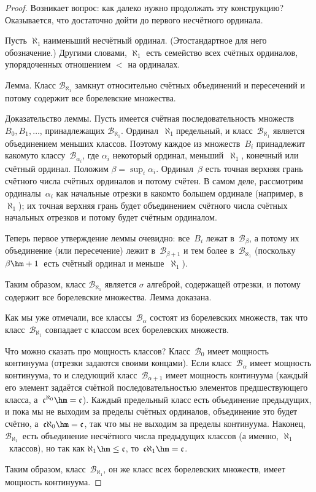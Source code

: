 \begin{proof}
Возникает вопрос: как далеко нужно продолжать эту конструкцию?
Оказывается, что достаточно дойти до первого несчётного
ординала.

Пусть $\aleph_1$\т наименьший
несчётный ординал. (Это\т стандартное
для него обозначение.) Другими словами, $\aleph_1$ есть семейство всех
счётных ординалов, упорядоченных отношением $<$ на ординалах.

\textsf{Лемма.} Класс $\mathcal{B}_{\aleph_1}$ замкнут
относительно счётных объединений
и пересечений и потому содержит все борелевские множества.

Доказательство леммы. Пусть имеется счётная последовательность
множеств $B_0, B_1, \dots$, принадлежащих $\mathcal{B}_{\aleph_1}$.
Ординал~$\aleph_1$\т предельный, и класс~$\mathcal{B}_{\aleph_1}$
является объединением
меньших классов. Поэтому каждое из множеств~$B_i$ принадлежит
какому\д то классу~$\mathcal{B}_{\alpha_i}$, где $\alpha_i$\т
некоторый ординал, меньший~$\aleph_1$,  конечный или
счётный ординал. Положим $\beta=\sup_i \alpha_i$. Ординал~$\beta$ есть
точная верхняя грань счётного числа счётных
ординалов и потому счётен. В самом деле, рассмотрим
ординалы~$\alpha_i$ как начальные отрезки в каком\д то большем ординале
(например, в~$\aleph_1$); их точная верхняя грань будет
объединением счётного числа счётных начальных отрезков и
потому будет счётным ординалом.

Теперь первое утверждение леммы очевидно: все~$B_i$ лежат
в~$\mathcal{B}_\beta$, а потому их объединение (или пересечение) лежит
в~$\mathcal{B}_{\beta+1}$ и тем более в~$\mathcal{B}_{\aleph_1}$
(поскольку $\beta\hm+1$~есть счётный ординал и меньше~$\aleph_1$).

Таким образом, класс $\mathcal{B}_{\aleph_1}$ является $\sigma$\д
алгеброй, содержащей отрезки, и потому содержит все
борелевские множества. Лемма доказана.

Как мы уже отмечали, все классы~$\mathcal{B}_{\alpha}$ состоят
из борелевских множеств, так что класс~$\mathcal{B}_{\aleph_1}$
совпадает с классом всех борелевских множеств.

Что можно сказать про мощность классов? Класс~$\mathcal{B}_0$ имеет
мощность континуума (отрезки задаются своими концами). Если
класс~$\mathcal{B}_\alpha$ имеет мощность континуума, то и следующий
класс~$\mathcal{B}_{\alpha+1}$ имеет мощность континуума (каждый его
элемент задаётся счётной последовательностью элементов
предшествующего класса, а~$\mathfrak{c}^{\aleph_0}\hm=\mathfrak{c}$).
Каждый предельный класс
есть объединение предыдущих, и пока мы не выходим за пределы
счётных ординалов, объединение это будет счётно,
а~$\mathfrak{c}\aleph_0\hm=\mathfrak{c}$, так что мы не выходим за
пределы континуума. Наконец, $\mathcal{B}_{\aleph_1}$~есть
объединение несчётного числа предыдущих классов (а именно,
$\aleph_1$~классов), но так как $\aleph_1\hm\le\mathfrak{c}$,
то~$\mathfrak{c}\aleph_1\hm=\mathfrak{c}$.

Таким образом, класс~$\mathcal{B}_{\aleph_1}$, он же класс всех
борелевских множеств, имеет мощность континуума.
\end{proof}

